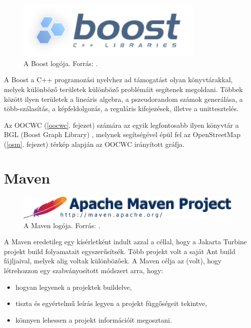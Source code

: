 \documentclass[a4paper,12pt]{report}
\begin{document}
\begin{figure}[ht]
\centerline{
\includegraphics[width=3.6in]{img/boost}}
\caption{A Boost logója. Forrás: \cite{boostlogo}.}
\label{boostlogo}
\end{figure}

\vspace{2mm}
A Boost a C++ programozási nyelvhez ad támogatást olyan könyvtárakkal, melyek különböző területek különböző problémáit segítenek megoldani. Többek között ilyen területek a lineáris algebra, a pszeudorandom számok generálása, a több-szálasítás, a képfeldolgozás, a reguláris kifejezések, illetve a unittesztelés. 

\vspace{2mm}
Az OOCWC (\ref{oocwc}. fejezet) számára az egyik legfontosabb ilyen könyvtár a BGL (Boost Graph Library) \cite{bgl}, melynek segítségével épül fel az OpenStreetMap \cite{osm} (\ref{osm}. fejezet) térkép alapján az OOCWC irányított gráfja.

\newpage
\section{Maven}
\label{maven}

\begin{figure}[ht]
\centerline{
\includegraphics[width=4.5in]{img/mavenlogo}}
\caption{A Maven logója. Forrás: \cite{mavenlogo}.}
\label{mavenlogo}
\end{figure}

A Maven eredetileg egy kísérletként indult azzal a céllal, hogy a Jakarta Turbine projekt \cite{turbine} build folyamatait egyszerűsítsék. Több projekt volt a saját Ant \cite{ant} build fájljaival, melyek alig voltak különbözőek. A Maven célja az (volt), hogy létrehozzon egy szabványosított módszert arra, hogy:

\begin{itemize}
\item hogyan legyenek a projektek buildelve,
\item tiszta és egyértelmű leírás legyen a projekt függőségeit tekintve,
\item könnyen lehessen a projekt információit megosztani.
\end{itemize}
\end{document}
